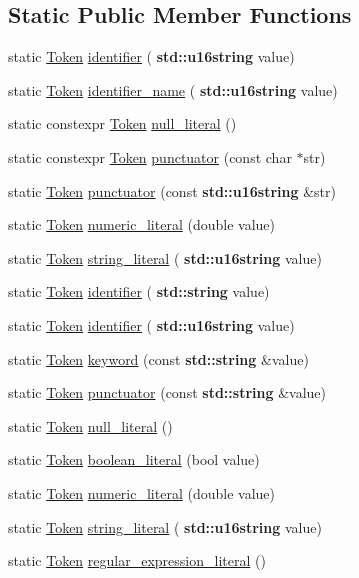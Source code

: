 \subsection*{Static Public Member Functions}
\begin{DoxyCompactItemize}
\item 
static \hyperlink{class_token}{Token} \hyperlink{class_token_af8cc69259b72cb8fb6f86da202564f15}{identifier} (\textbf{ std\+::u16string} value)
\item 
static \hyperlink{class_token}{Token} \hyperlink{class_token_ab97eb94f13e337e95b9a31a1956085ed}{identifier\+\_\+name} (\textbf{ std\+::u16string} value)
\item 
static constexpr \hyperlink{class_token}{Token} \hyperlink{class_token_af892768a64f034c6d941281fd7d6b758}{null\+\_\+literal} ()
\item 
static constexpr \hyperlink{class_token}{Token} \hyperlink{class_token_af63a6600ca9c654e40bea24483b2226e}{punctuator} (const char $\ast$str)
\item 
static \hyperlink{class_token}{Token} \hyperlink{class_token_a958d66fdb60bf55bc8ac8c4ea197e8b8}{punctuator} (const \textbf{ std\+::u16string} \&str)
\item 
static \hyperlink{class_token}{Token} \hyperlink{class_token_a6b30fa87c5bbd0c0b7b0e7b4344eeb8b}{numeric\+\_\+literal} (double value)
\item 
static \hyperlink{class_token}{Token} \hyperlink{class_token_a2fcf0ef9b36f5dec4ddc654aebd943ce}{string\+\_\+literal} (\textbf{ std\+::u16string} value)
\item 
static \hyperlink{class_token}{Token} \hyperlink{class_token_a8ec1ef00a7536071616efab63833c970}{identifier} (\textbf{ std\+::string} value)
\item 
static \hyperlink{class_token}{Token} \hyperlink{class_token_af8cc69259b72cb8fb6f86da202564f15}{identifier} (\textbf{ std\+::u16string} value)
\item 
static \hyperlink{class_token}{Token} \hyperlink{class_token_a379cdb72ef80cd7375fd2f31963aeafa}{keyword} (const \textbf{ std\+::string} \&value)
\item 
static \hyperlink{class_token}{Token} \hyperlink{class_token_a62120a6cb34feb44f709af396234d1bb}{punctuator} (const \textbf{ std\+::string} \&value)
\item 
static \hyperlink{class_token}{Token} \hyperlink{class_token_a2b8cea2db3fa862b93feeebec37ec079}{null\+\_\+literal} ()
\item 
static \hyperlink{class_token}{Token} \hyperlink{class_token_abf22f2214f3329ccb66ce5d9d9d16fd8}{boolean\+\_\+literal} (bool value)
\item 
static \hyperlink{class_token}{Token} \hyperlink{class_token_a6b30fa87c5bbd0c0b7b0e7b4344eeb8b}{numeric\+\_\+literal} (double value)
\item 
static \hyperlink{class_token}{Token} \hyperlink{class_token_a2fcf0ef9b36f5dec4ddc654aebd943ce}{string\+\_\+literal} (\textbf{ std\+::u16string} value)
\item 
static \hyperlink{class_token}{Token} \hyperlink{class_token_a6309eea1bba53663cbf2b3fc1fdb3b08}{regular\+\_\+expression\+\_\+literal} ()
\end{DoxyCompactItemize}
